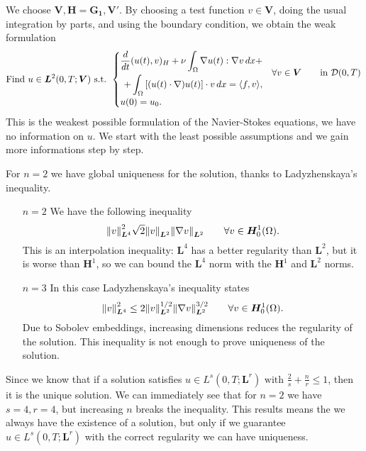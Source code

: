 \begin{remark}
    We choose \(\bm{V}, \bm{H} = \bm{G_1}, \bm{V'}\). By choosing a test function \(v \in \bm{V}\), doing the usual integration by parts, and using the boundary condition, we obtain the weak formulation
    \begin{equation*}
        \text{Find } u \in \bm{L}^2(0,T;\bm{V}) \text{ s.t. }
        \begin{cases}
            \begin{aligned}
                \frac{d}{dt}(u(t), v)_H + \nu \int_\Omega \nabla u(t) : \nabla v \, dx +\\
                + \int_\Omega \left[ (u(t) \cdot \nabla) u(t)\right] \cdot v \, dx = \langle f, v \rangle,
            \end{aligned} & \forall v \in \bm{V} \qquad \text{in } \mathcal{D}(0,T) \\
            u(0) = u_0.
        \end{cases}
    \end{equation*}
    This is the weakest possible formulation of the Navier-Stokes equations, we have no information on \(u\). We start with the least possible assumptions and we gain more informations step by step.
\end{remark}
For \(n=2\) we have global uniqueness for the solution, thanks to Ladyzhenskaya's inequality. 
\begin{itemize}
    \item[\(n=2\)] We have the following inequality
    \[
        \norm{v}^2_{\bm{L}^4} \sqrt{2} \norm{v}_{\bm{L}^2} \norm{\nabla v}_{\bm{L}^2} \qquad \forall v \in \bm{H}^1_0(\Omega).
    \]
    This is an interpolation inequality: \(\bm{L}^4\) has a better regularity than \(\bm{L}^2\), but it is worse than \(\bm{H}^1\), so we can bound the \(\bm{L}^4\) norm with the \(\bm{H}^1\) and \(\bm{L}^2\) norms. 
    \item[\(n=3\)] In this case Ladyzhenskaya's inequality states
    \[
        \norm{v}^2_{\bm{L}^4} \leq 2 \norm{v}_{\bm{L}^2}^{1/2} \norm{\nabla v}_{\bm{L}^2}^{3/2} \qquad \forall v \in \bm{H}^1_0(\Omega).
    \]
    Due to Sobolev embeddings, increasing dimensions reduces the regularity of the solution. This inequality is not enough to prove uniqueness of the solution.
\end{itemize}
Since we know that if a solution satisfies \(u \in L^s(0,T;\bm{L}^r) \text{ with } \frac{2}{s}+\frac{n}{r} \leq 1\), then it is the unique solution. We can immediately see that for \(n=2\) we have \(s=4, r=4\), but increasing \(n\) breaks the inequality. This results means the we always have the existence of a solution, but only if we guarantee \(u \in L^s(0,T;\bm{L}^r)\) with the correct regularity we can have uniqueness.

